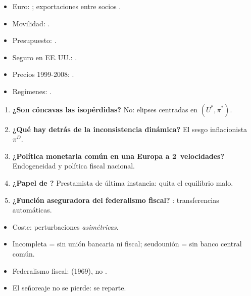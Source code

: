\documentclass{article}
\begin{document}
\begin{columnas}
\anexorepaso
{}
\begin{itemize}
\item Euro: ; exportaciones entre socios .
\item Movilidad: .
\item Presupuesto: .
\item Seguro en EE.\,UU.: .
\item Precios 1999-2008: .
\item Regímenes: .
\end{itemize}
\begin{enumerate}
\item \textbf{¿Son cóncavas las isopérdidas?} No: elipses centradas en $(U^*,\pi^*)$.
\item \textbf{¿Qué hay detrás de la inconsistencia dinámica?} El sesgo inflacionista $\pi^D$.
\item \textbf{¿Política monetaria común en una Europa a 2~velocidades?} Endogeneidad y política fiscal nacional.
\item \textbf{¿Papel de ?} Prestamista de última instancia: quita el equilibrio malo.
\item \textbf{¿Función aseguradora del federalismo fiscal?} : transferencias automáticas.
\end{enumerate}
\begin{trampa}
\begin{itemize}
\item Coste: perturbaciones \emph{asimétricas}.
\item Incompleta = sin unión bancaria ni fiscal; seudounión = sin banco central común.
\item Federalismo fiscal:  (1969), no .
\item El señoreaje no se pierde: se reparte.
\end{itemize}
\end{trampa}

\end{columnas}
\end{document}
